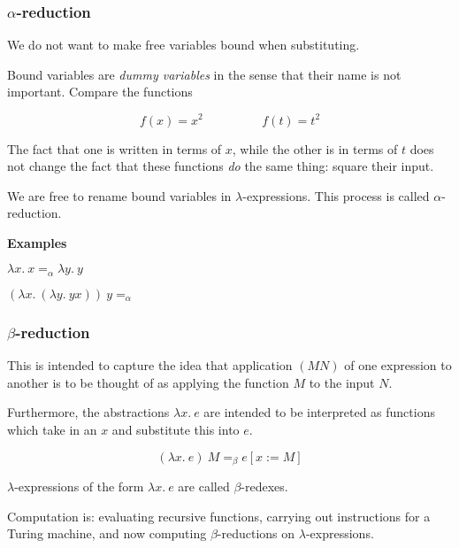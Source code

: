 \documentclass{beamer}
\begin{document}
\begin{frame}
	\frametitle{$\alpha$-reduction}

	We do not want to make free variables bound when substituting.

	\vspace{0.2cm}

	Bound variables are \emph{dummy variables} in the sense that their name is not important. Compare the functions 

	$$f(x) = x^2 \hspace{2cm} f(t) = t^2$$

	The fact that one is written in terms of $x$, while the other is in terms of $t$ does not change the fact that these functions \emph{do} the same thing: square their input. 

	\vspace{0.5cm}

	We are free to rename bound variables in $\lambda$-expressions. This process is called $\alpha$-reduction. 

	\vspace{0.5cm}

	{\bf Examples}

	$\lambda x. \ x =_{\alpha} \lambda y. \ y$

	\vspace{0.1cm}

	$(\lambda x. \ (\lambda y. \ y x)) \ y =_\alpha$

\end{frame}

\begin{frame}
	\frametitle{$\beta$-reduction}

	This is intended to capture the idea that application $(M N)$ of one expression to another is to be thought of as applying the function $M$ to the input $N$.
	
	\vspace{0.5cm}

	Furthermore, the abstractions $\lambda x. \ e$ are intended to be interpreted as functions which take in an $x$ and substitute this into $e$. 

	\vspace{0.3cm}

	$$(\lambda x. \ e) \ M =_{\beta} e[x:=M]$$

	\vspace{0.3cm}

	$\lambda$-expressions of the form $\lambda x. \ e$ are called $\beta$-redexes.

	\vspace{0.3cm}

	Computation is: evaluating recursive functions, carrying out instructions for a Turing machine, and now computing $\beta$-reductions on $\lambda$-expressions.
	
\end{frame}
\end{document}
